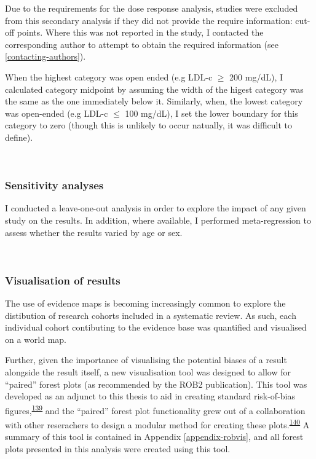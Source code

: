\documentclass[a4paper, twoside]{templates/ociamthesis}
\begin{document}
Due to the requirements for the dose response analysis, studies were excluded from this secondary analysis if they did not provide the require information: cut-off points. Where this was not reported in the study, I contacted the corresponding author to attempt to obtain the required information (see \ref{contacting-authors}).

When the highest category was open ended (e.g LDL-c \(\geqslant\) 200 mg/dL), I calculated category midpoint by assuming the width of the higest category was the same as the one immediately below it. Similarly, when, the lowest category was open-ended (e.g LDL-c \(\leqslant\) 100 mg/dL), I set the lower boundary for this category to zero (though this is unlikely to occur natually, it was difficult to define).

~

\hypertarget{sensitivity-analyses}{%
\subsubsection{Sensitivity analyses}\label{sensitivity-analyses}}

I conducted a leave-one-out analysis in order to explore the impact of any given study on the results. In addition, where available, I performed meta-regression to assess whether the results varied by age or sex.

~

\hypertarget{visualisation-of-results}{%
\subsubsection{Visualisation of results}\label{visualisation-of-results}}

The use of evidence maps is becoming increasingly common to explore the distibution of research cohorts included in a systematic review. As such, each individual cohort contibuting to the evidence base was quantified and visualised on a world map.

Further, given the importance of visualising the potential biases of a result alongside the result itself, a new visualisation tool was designed to allow for ``paired'' forest plots (as recommended by the ROB2 publication). This tool was developed as an adjunct to this thesis to aid in creating standard risk-of-bias figures,\textsuperscript{\protect\hyperlink{ref-mcguinness2020robvisPaper}{139}} and the ``paired'' forest plot functionality grew out of a collaboration with other reserachers to design a modular method for creating these plots.\textsuperscript{\protect\hyperlink{ref-zotero-14999}{140}} A summary of this tool is contained in Appendix \ref{appendix-robvis}, and all forest plots presented in this analysis were created using this tool.
\end{document}
